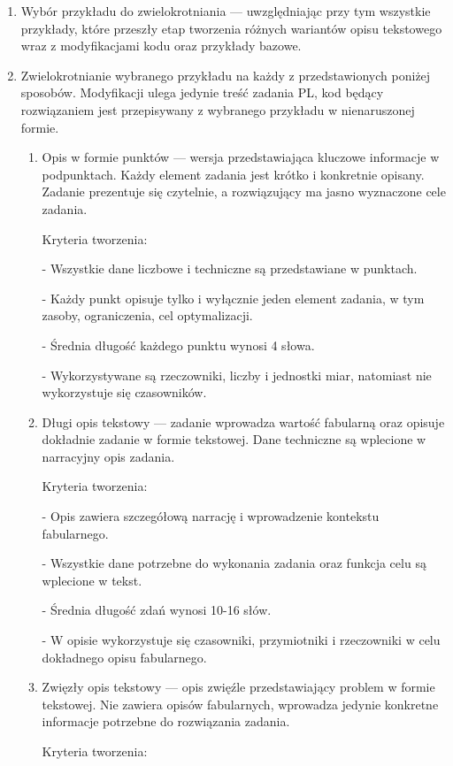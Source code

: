 \begin{enumerate}
\item Wybór przykładu do zwielokrotniania --- uwzględniając przy tym wszystkie przykłady, które przeszły etap tworzenia różnych wariantów opisu tekstowego wraz z modyfikacjami kodu oraz przykłady bazowe.
\item Zwielokrotnianie wybranego przykładu na każdy z przedstawionych poniżej sposobów. Modyfikacji ulega jedynie treść zadania PL, kod  będący rozwiązaniem jest przepisywany z wybranego przykładu w nienaruszonej formie.
\begin{enumerate}
\item Opis w formie punktów --- wersja przedstawiająca kluczowe informacje w podpunktach. Każdy element zadania jest krótko i konkretnie opisany. Zadanie prezentuje się czytelnie, a rozwiązujący ma jasno wyznaczone cele zadania.

Kryteria tworzenia:

- Wszystkie dane liczbowe i techniczne są przedstawiane w punktach.

- Każdy punkt opisuje tylko i wyłącznie jeden element zadania, w tym zasoby, ograniczenia, cel optymalizacji.

- Średnia długość każdego punktu wynosi 4 słowa.

- Wykorzystywane są rzeczowniki, liczby i jednostki miar, natomiast nie wykorzystuje się czasowników.

\item Długi opis tekstowy --- zadanie wprowadza wartość fabularną oraz opisuje dokładnie zadanie w formie tekstowej. Dane techniczne są wplecione w narracyjny opis zadania.

Kryteria tworzenia:

- Opis zawiera szczegółową narrację i wprowadzenie kontekstu fabularnego.

- Wszystkie dane potrzebne do wykonania zadania oraz funkcja celu  są wplecione w tekst.

- Średnia długość zdań wynosi 10-16 słów.

- W opisie wykorzystuje się czasowniki, przymiotniki i rzeczowniki w celu dokładnego opisu fabularnego.

\item Zwięzły opis tekstowy --- opis zwięźle przedstawiający problem w formie tekstowej. Nie zawiera opisów fabularnych, wprowadza jedynie konkretne informacje potrzebne do rozwiązania zadania.

Kryteria tworzenia:


\end{enumerate}
\end{enumerate}
